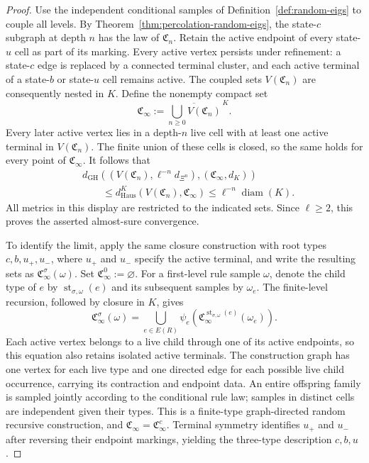 \documentclass[scheme=plain,11pt]{ctexart}
\theoremstyle{definition}
\theoremstyle{remark}
\begin{document}
\begin{proof}
Use the independent conditional samples of Definition~\ref{def:random-eigs} to couple all levels.
By Theorem~\ref{thm:percolation-random-eigs}, the state-$c$ subgraph at depth $n$ has the law of $\mathfrak C_n$.
Retain the active endpoint of every state-$u$ cell as part of its marking.
Every active vertex persists under refinement: a state-$c$ edge is replaced by a connected terminal cluster, and each active terminal of a state-$b$ or state-$u$ cell remains active.
The coupled sets $V(\mathfrak C_n)$ are consequently nested in $K$.
Define the nonempty compact set
\[
 \mathfrak C_\infty:=
 \overline{\bigcup_{n\ge0}V(\mathfrak C_n)}^{\,K}.
\]
Every later active vertex lies in a depth-$n$ live cell with at least one active terminal in $V(\mathfrak C_n)$.
The finite union of these cells is closed, so the same holds for every point of $\mathfrak C_\infty$.
It follows that
\[
\begin{aligned}
 &d_{\mathrm{GH}}\!\left(
   (V(\mathfrak C_n),\ell^{-n}d_{\Xi^n}),
   (\mathfrak C_\infty,d_K)\right)\\
 &\qquad\le
 d_{\mathrm{Haus}}^K\!\left(V(\mathfrak C_n),\mathfrak C_\infty\right)
 \le \ell^{-n}\operatorname{diam}(K).
\end{aligned}
\]
All metrics in this display are restricted to the indicated sets.
Since $\ell\ge2$, this proves the asserted almost-sure convergence.

To identify the limit, apply the same closure construction with root types $c,b,u_+,u_-$, where $u_+$ and $u_-$ specify the active terminal, and write the resulting sets as $\mathfrak C_\infty^\sigma(\omega)$.
Set $\mathfrak C_\infty^0:=\varnothing$.
For a first-level rule sample $\omega$, denote the child type of $e$ by $\operatorname{st}_{\sigma,\omega}(e)$ and its subsequent samples by $\omega_e$.
The finite-level recursion, followed by closure in $K$, gives
\[
 \mathfrak C_\infty^\sigma(\omega)
 =\bigcup_{e\in E(R)}
   \psi_e\!\left(
     \mathfrak C_\infty^{\operatorname{st}_{\sigma,\omega}(e)}(\omega_e)
   \right).
\]
Each active vertex belongs to a live child through one of its active endpoints, so this equation also retains isolated active terminals.
The construction graph has one vertex for each live type and one directed edge for each possible live child occurrence, carrying its contraction and endpoint data.
An entire offspring family is sampled jointly according to the conditional rule law; samples in distinct cells are independent given their types.
This is a finite-type graph-directed random recursive construction, and $\mathfrak C_\infty=\mathfrak C_\infty^c$.
Terminal symmetry identifies $u_+$ and $u_-$ after reversing their endpoint markings, yielding the three-type description $c,b,u$.
\end{proof}
\end{document}
